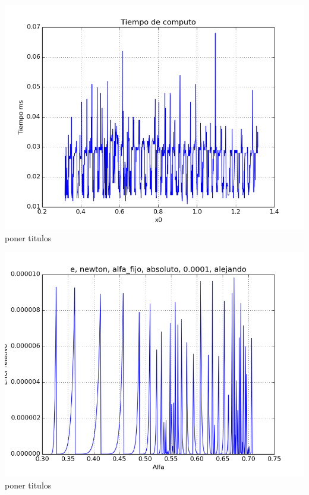 \begin{center}
\includegraphics[scale=0.5]{graficos/tiempo-e-secante-alfa_fijo-absoluto-0.0001-alejando.png}\\
poner titulos
\end{center}

\begin{center}
\includegraphics[scale=0.5]{graficos/relativo-e-newton-alfa_fijo-absoluto-0.0001-alejando.png}\\
poner titulos
\end{center}

